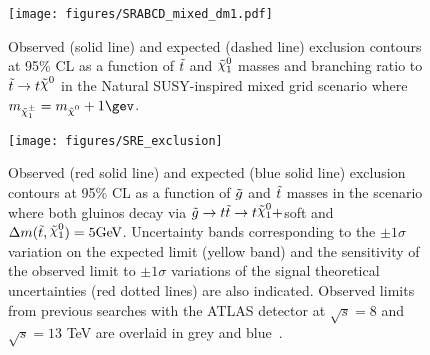 \begin{figure}[htpb]
  \begin{center}
    \texttt{[image: figures/SRABCD\_mixed\_dm1.pdf]}
    \caption[Exclusion contours for the Natural SUSY-inspired mixed grid scenario]{Observed (solid line) and expected (dashed line) exclusion contours at 95\% CL as a function of $\tilde{t}$ and $\ninoone$ masses and branching ratio to $\stop\to t\LSP$ in the Natural SUSY-inspired mixed grid scenario where $m_{\chinoonepm}=\mLSP+1\gev$. %
}
    \label{fig:tbMet_exclusion}
  \end{center}
\end{figure}
\clearpage

\begin{figure}[htpb]
  \begin{center}
    \texttt{[image: figures/SRE\_exclusion]}
    \caption[Exclusion controus for the scenario where both
      gluinos decay via $\gluino\to t\stop\to t\ninoone$]{Observed (red solid line) and expected (blue solid line)
      exclusion contours at 95\% CL as a function
      of $\tilde{g}$ and $\tilde{t}$ masses in the scenario where both
      gluinos decay via $\gluino\to t\stop\to t\ninoone+$soft
      and $\Delta m(\stop,\ninoone)=5\GeV$. Uncertainty bands corresponding to the $\pm 1
      \sigma$ variation on the expected limit (yellow band) and the
      sensitivity of the observed limit to $\pm 1\sigma$ variations of
      the signal theoretical uncertainties (red dotted lines) are also
      indicated. Observed limits from previous searches with the ATLAS detector at $\sqrt{s}=8$ and $\sqrt{s}=13$ TeV are overlaid in grey and blue~\cite{GtcStop1L,Gtc1L,GtcMonojet}.}
    \label{fig:SRE_exclusion}
  \end{center}
\end{figure}
\clearpage

%



